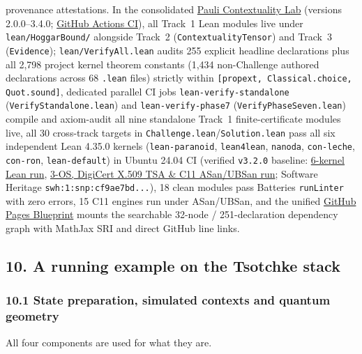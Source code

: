 \documentclass[11pt,a4paper]{article}
\begin{document}
provenance attestations. In the consolidated \href{https://github.com/0thernes/pauli-contextuality-lab}{Pauli Contextuality Lab} (versions 2.0.0--3.4.0; \href{https://github.com/0thernes/pauli-contextuality-lab/actions}{GitHub Actions CI}), all Track~1 Lean modules live under \nolinkurl{lean/HoggarBound/} alongside Track~2 (\nolinkurl{ContextualityTensor}) and Track~3 (\nolinkurl{Evidence}); \nolinkurl{lean/VerifyAll.lean} audits 255 explicit headline declarations plus all 2,798 project kernel theorem constants (1,434 non-Challenge authored declarations across 68 \texttt{.lean} files) strictly within \texttt{[propext, Classical.choice, Quot.sound]}, dedicated parallel CI jobs \nolinkurl{lean-verify-standalone} (\nolinkurl{VerifyStandalone.lean}) and \nolinkurl{lean-verify-phase7} (\nolinkurl{VerifyPhaseSeven.lean}) compile and axiom-audit all nine standalone Track~1 finite-certificate modules live, all 30 cross-track targets in \nolinkurl{Challenge.lean}/\nolinkurl{Solution.lean} pass all six independent Lean 4.35.0 kernels (\texttt{lean-paranoid}, \texttt{lean4lean}, \texttt{nanoda}, \texttt{con-leche}, \texttt{con-ron}, \texttt{lean-default}) in Ubuntu 24.04 CI (verified \texttt{v3.2.0} baseline: \href{https://github.com/0thernes/pauli-contextuality-lab/actions/runs/46007131056}{6-kernel Lean run}, \href{https://github.com/0thernes/pauli-contextuality-lab/actions/runs/46007131046}{3-OS, DigiCert X.509 TSA \& C11 ASan/UBSan run}; Software Heritage \nolinkurl{swh:1:snp:cf9ae7bd...}), 18 clean modules pass Batteries \texttt{runLinter} with zero errors, 15 C11 engines run under ASan/UBSan, and the unified \href{https://0thernes.github.io/pauli-contextuality-lab/blueprint/}{GitHub Pages Blueprint} mounts the searchable 32-node / 251-declaration dependency graph with MathJax SRI and direct GitHub line links.

\subsection{10. A running example on the Tsotchke stack}\label{10-a-running-example-on-the-tsotchke-stack}

\subsubsection{10.1 State preparation, simulated contexts and quantum geometry}\label{101-state-preparation-simulated-contexts-and-quantum-geometry}

All four components are used for what they are.
\end{document}
